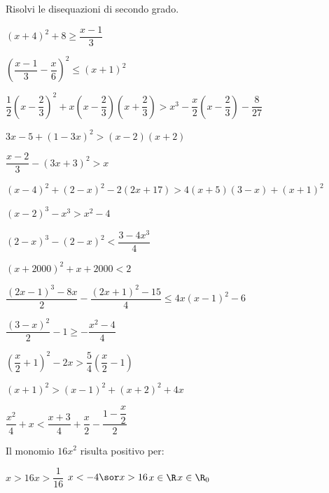 \begin{esercizio}[*]
\label{ese:4.20}
Risolvi le disequazioni di secondo grado.

\begin{enumeratea}
\item \((x+4)^2+8 \geqslant \dfrac{x-1} 3\)
\sol{\R}
\item \(\left(\dfrac{x-1} 3-\dfrac x 6\right)^2 \leqslant (x+1)^2\)
\item \(\dfrac 1 2\left(x-\dfrac 2 3\right)^2+x\left(x-\dfrac 2 3\right)
\left(x+\dfrac 2 3\right)>x^3-\dfrac x 2\left(x-\dfrac 2 3\right)-\dfrac 
8{27}\)
\item \(3x-5+(1-3x)^2>(x-2)(x+2)\)
\item \(\dfrac{x-2} 3-(3x+3)^2>x\)
\item \((x-4)^2+(2-x)^2-2(2x+17)>4(x+5)(3-x)+(x+1)^2\)
\item \((x-2)^3-x^3>x^2-4\)
\item \((2-x)^3-(2-x)^2<\dfrac{3-4x^3} 4\)
\sol{\emptyset}
\item \((x+2000)^2+x+2000<2\)
\item \(\dfrac{\left(2x-1\right)^3-8x} 2-\dfrac{\left(2x+1\right)^2-15} 
4 \leqslant 
4x\left(x-1\right)^2-6\)
\sol{}
\item \(\dfrac{(3-x)^2} 2-1 \geqslant -\dfrac{x^2-4} 4\) 
\item \(\left(\dfrac x 2+1\right)^2-2x>\dfrac 5 4\left(\dfrac x 2-1\right)\)
\sol{}
\item \((x+1)^2>(x-1)^2+(x+2)^2+4x\)
\sol{\emptyset }
\item \(\dfrac{x^2} 4+x<\dfrac{x+3} 4+\dfrac x 2-\dfrac{1-\dfrac x 2} 2\)
\end{enumeratea}
\end{esercizio}

\begin{esercizio}
\label{ese:4.23}
Il monomio \(16x^2\) risulta positivo per:

\quad \(x>16\)\qquad {}\quad \(x>\dfrac 
1{16}\)\qquad{}\quad 
\(x<-4 \sor 
x>16\)\qquad{}\quad \(x\in \R\)\qquad{}\quad \(x\in \R_0\)

\end{esercizio}

